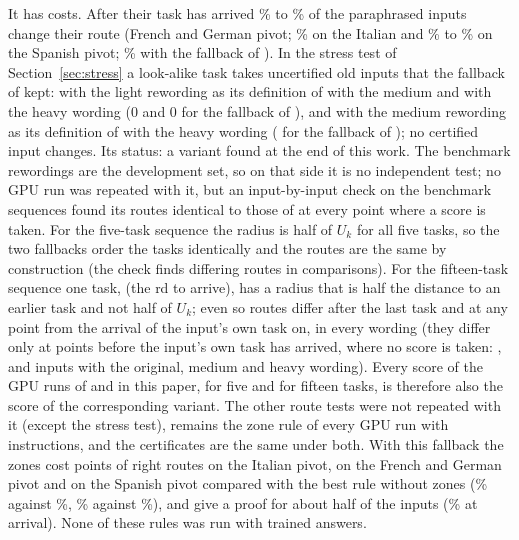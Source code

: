 It has costs. After their task has arrived \RerouteCertFourChanged{}\% to \RerouteBgChanged{}\% of the paraphrased inputs change their route (French and German pivot; \RerouteBgItChanged{}\% on the Italian and \RerouteCertFourEsChanged{}\% to \RerouteBgEsChanged{}\% on the Spanish pivot; \RerouteCertChanged{}\% with the fallback of \cert{}). In the stress test of Section~\ref{sec:stress} a look-alike task takes uncertified old inputs that the fallback of \cert{} kept: with the light rewording as its definition \RerouteStressCertFourMedium{} of \RerouteStressOld{} with the medium and \RerouteStressCertFourHeavy{} with the heavy wording (0 and 0 for the fallback of \cert{}), and with the medium rewording as its definition \RerouteStressMedCertFourHeavy{} of \RerouteStressOld{} with the heavy wording (\RerouteStressMedCertHeavy{} for the fallback of \cert{}); no certified input changes. Its status: a variant found at the end of this work. The benchmark rewordings are the development set, so on that side it is no independent test;
no GPU run was repeated with it, but an input-by-input check on the benchmark sequences found its routes identical to those of \cert{} at every point where a score is taken. For the five-task sequence the radius is half of $U_k$ for all five tasks, so the two fallbacks order the tasks identically and the routes are the same by construction (the check finds \RerouteIdFiveLast{} differing routes in \RerouteIdFiveComparisons{} comparisons). For the fifteen-task sequence one task, \texttt{\RerouteIdTask{}} (the \RerouteIdTaskPos{}rd to arrive), has a radius that is half the distance to an earlier task and not half of $U_k$; even so \RerouteIdFifteenLast{} routes differ after the last task and \RerouteIdFifteenScored{} at any point from the arrival of the input's own task on, in every wording (they differ only at points before the input's own task has arrived, where no score is taken: \RerouteIdFifteenBeforeOriginal{}, \RerouteIdFifteenBeforeMedium{} and \RerouteIdFifteenBeforeHeavy{} inputs with the original, medium and heavy wording). Every score of the GPU runs of \cert{} and \nearest{} in this paper, for five and for fifteen tasks, is therefore also the score of the corresponding variant. The other route tests were not repeated with it (except the stress test), \cert{} remains the zone rule of every GPU run with instructions, and the certificates are the same under both. With this fallback the zones cost \RerouteZonesCost{} points of right routes on the Italian pivot, \RerouteZonesCostFG{} on the French and German pivot and \RerouteZonesCostEs{} on the Spanish pivot
compared with the best rule without zones (\RerouteBgItOwn{}\% against \RerouteCertFourItOwn{}\%, \RerouteBgOwnEnd{}\% against \RerouteCertFourOwnEnd{}\%), and give a proof for about half of the inputs (\RerouteCertInZone{}\% at arrival). None of these rules was run with trained answers.

